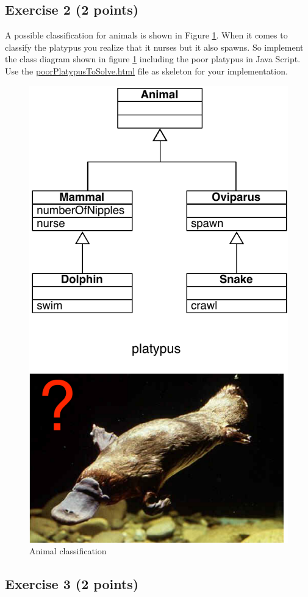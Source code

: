 \documentclass [11pt, a4wide, twoside]{article}
\begin{document}
\vspace{0.5cm}

\solution{}




\subsection*{Exercise 2 (2 points)}


A possible classification for animals is shown in Figure \ref{fig:ex2}. When it comes to classify the platypus you realize that it nurses but it also spawns. So implement the class diagram shown in figure \ref{fig:ex2} including the poor platypus in Java Script. Use the \href{http://scg.unibe.ch/download/lectures/pl2018-exercises/poorPlatypusToSolve.html}{poorPlatypusToSolve.html} file as skeleton for your implementation.

\begin{figure}[ht!]
\begin{center}
\includegraphics[width=0.4\columnwidth]{solutions/Ex2.pdf}
\caption{Animal classification}
\label{fig:ex2}
\end{center}
\end{figure}

\solution{}


\subsection*{Exercise 3 (2 points)}
\end{document}
